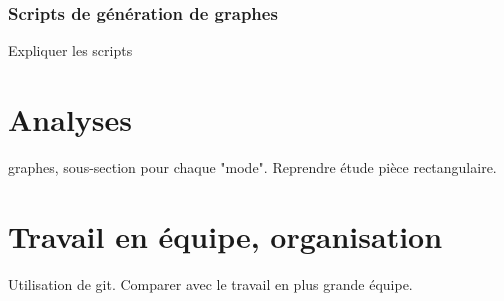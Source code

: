 \documentclass[a4paper,11pt]{article}
\begin{document}
\subsubsection*{Scripts de génération de graphes}

Expliquer les scripts


\section{Analyses}

graphes, sous-section pour chaque "mode". Reprendre étude pièce rectangulaire.


\section{Travail en équipe, organisation}

Utilisation de git.
Comparer avec le travail en plus grande équipe.
\end{document}
